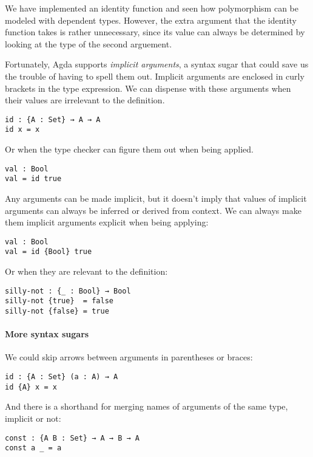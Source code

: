 \documentclass[12pt, a4paper]{article}
\begin{document}
We have implemented an identity function and seen how polymorphism can be modeled
with dependent types. However, the extra argument that the identity function
takes is rather unnecessary, since its value can always be determined by looking
at the type of the second arguement.

Fortunately, Agda supports \textit{implicit arguments}, a syntax sugar that could
save us the trouble of having to spell them out. Implicit arguments are enclosed
in curly brackets in the type expression. We can dispense with these arguments
when their values are irrelevant to the definition.

\begin{lstlisting}
id : {A : Set} → A → A
id x = x
\end{lstlisting}

Or when the type checker can figure them out when being applied.

\begin{lstlisting}
val : Bool
val = id true
\end{lstlisting}

Any arguments can be made implicit, but it doesn't imply that values of
implicit arguments can always be inferred or derived from context. We can always
make them implicit arguments explicit when being applying:

\begin{lstlisting}
val : Bool
val = id {Bool} true
\end{lstlisting}

Or when they are relevant to the definition:

\begin{lstlisting}
silly-not : {_ : Bool} → Bool
silly-not {true}  = false
silly-not {false} = true
\end{lstlisting}

\paragraph{More syntax sugars}
We could skip arrows between arguments in parentheses or braces:

\begin{lstlisting}
id : {A : Set} (a : A) → A
id {A} x = x
\end{lstlisting}

And there is a shorthand for merging names of arguments of the same type, implicit or not:

\begin{lstlisting}
const : {A B : Set} → A → B → A
const a _ = a
\end{lstlisting}
\end{document}
